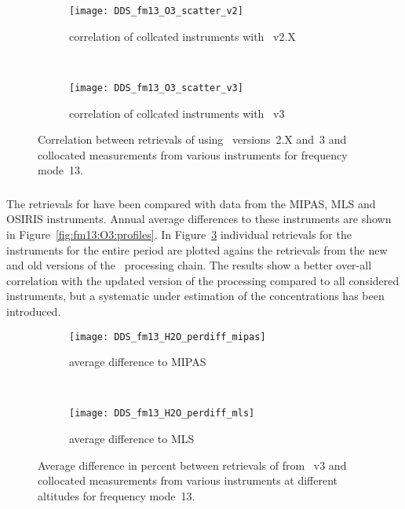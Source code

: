 \begin{figure}[htpb]
    \centering
    \begin{subfigure}[b]{0.49\textwidth}
        \texttt{[image: DDS\_fm13\_O3\_scatter\_v2]}
        \caption{correlation of collcated instruments with \smr~v2.X}
        \label{fig:fm13:O3:scatter:v2}
    \end{subfigure}
    \,
    \begin{subfigure}[b]{0.49\textwidth}
        \texttt{[image: DDS\_fm13\_O3\_scatter\_v3]}
        \caption{correlation of collcated instruments with \smr~v3}
        \label{fig:fm13:O3:scatter:v3}
    \end{subfigure}
    \caption{Correlation between retrievals of  using \smr\
    versions~2.X and~3 and collocated measurements from various instruments
    for frequency mode~13.}
    \label{fig:fm13:O3:scatter}
\end{figure}

\subsubsection{}
\label{sec:fm13:comparison:O3}
The retrievals for \chem{O_3} have been compared with data from the MIPAS, MLS
and OSIRIS instruments. Annual average differences to these instruments are
shown in Figure~\ref{fig:fm13:O3:profiles}. In Figure~\ref{fig:fm13:O3:scatter}
individual retrievals for the instruments for the entire period are plotted
agains the retrievals from the new and old versions of the \smr\ processing
chain. The results show a better over-all correlation with the updated version
of the processing compared to all considered instruments, but a systematic
under estimation of the concentrations has been introduced.



\begin{figure}[htpb]
    \centering
    \begin{subfigure}[b]{0.49\textwidth}
        \texttt{[image: DDS\_fm13\_H2O\_perdiff\_mipas]}
        \caption{average difference to MIPAS}
        \label{fig:fm13:H2O:profiles:MIPAS}
    \end{subfigure}
    \,
    \begin{subfigure}[b]{0.49\textwidth}
        \texttt{[image: DDS\_fm13\_H2O\_perdiff\_mls]}
        \caption{average difference to MLS}
        \label{fig:fm13:H2O:profiles:MLS}
    \end{subfigure}
    \caption{Average difference in percent between retrievals of 
    from \smr~v3 and collocated measurements from various instruments at
    different altitudes for frequency mode~13.}

    \label{fig:fm13:H2O:profiles}
\end{figure}

